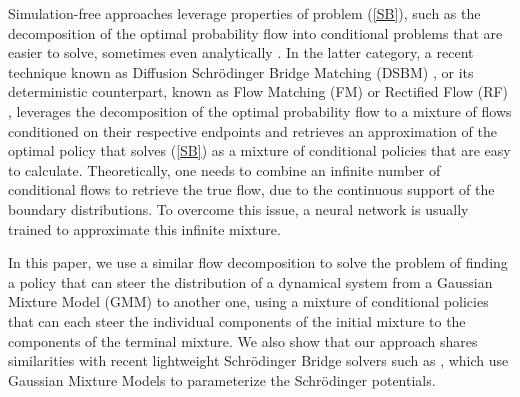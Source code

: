 \documentclass[twoside]{article}
\renewcommand{\eqref}[1]{(\ref{#1})}
\begin{document}
Simulation-free approaches leverage properties of problem \eqref{SB}, such as the decomposition of the optimal probability flow into conditional problems that are easier to solve, sometimes even analytically \citep{chen2016optimal, lipman2022flow, liu2022flow}.
In the latter category, a recent technique known as Diffusion Schr\"odinger Bridge Matching (DSBM) \citep{peluchetti2023diffusion, shi2023diffusion}, or its deterministic counterpart, known as Flow Matching (FM) \cite{ lipman2022flow} or Rectified Flow (RF) \cite{liu2022flow}, leverages the decomposition of the optimal probability flow to a mixture of flows conditioned on their respective endpoints and retrieves an approximation of the optimal policy that solves \eqref{SB} as a mixture of conditional policies that are easy to calculate.
Theoretically, one needs to combine an infinite number of conditional flows to retrieve the true flow, due to the continuous support of the boundary distributions.
To overcome this issue, a neural network is usually trained to approximate this infinite mixture.  

In this paper, we use a similar flow decomposition to solve the problem of finding a policy that can steer the distribution of a dynamical system from a Gaussian Mixture Model (GMM) to another one, using a mixture of conditional policies that can each steer the individual components of the initial mixture to the components of the terminal mixture. 
We also show that our approach shares similarities with recent lightweight Schr\"{o}dinger Bridge solvers such as \citep{korotin2024light, gushchin24light}, which use Gaussian Mixture Models to parameterize the Schr\"{o}dinger potentials.
\end{document}
